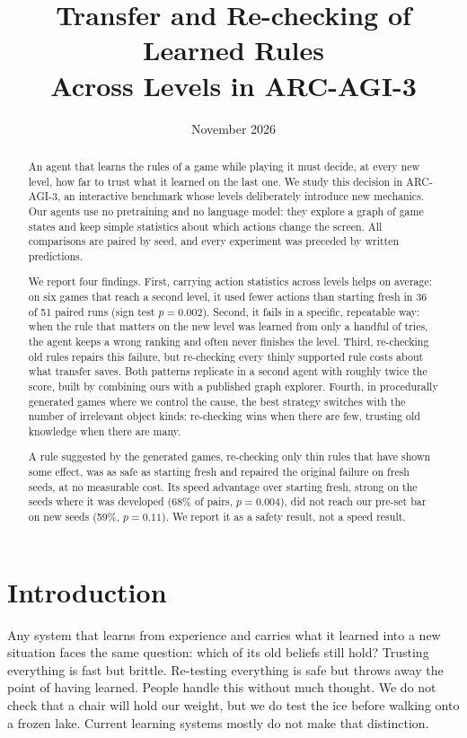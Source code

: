\documentclass[11pt,a4paper]{article}
\title{Transfer and Re-checking of Learned Rules\\Across Levels in ARC-AGI-3}
\author{}
\date{November 2026}
\begin{document}
\maketitle

\begin{abstract}
An agent that learns the rules of a game while playing it must decide, at every new level, how far to trust what it learned on the last one. We study this decision in ARC-AGI-3, an interactive benchmark whose levels deliberately introduce new mechanics. Our agents use no pretraining and no language model: they explore a graph of game states and keep simple statistics about which actions change the screen. All comparisons are paired by seed, and every experiment was preceded by written predictions.

We report four findings. First, carrying action statistics across levels helps on average: on six games that reach a second level, it used fewer actions than starting fresh in 36 of 51 paired runs (sign test $p = 0.002$). Second, it fails in a specific, repeatable way: when the rule that matters on the new level was learned from only a handful of tries, the agent keeps a wrong ranking and often never finishes the level. Third, re-checking old rules repairs this failure, but re-checking every thinly supported rule costs about what transfer saves. Both patterns replicate in a second agent with roughly twice the score, built by combining ours with a published graph explorer. Fourth, in procedurally generated games where we control the cause, the best strategy switches with the number of irrelevant object kinds: re-checking wins when there are few, trusting old knowledge when there are many.

A rule suggested by the generated games, re-checking only thin rules that have shown some effect, was as safe as starting fresh and repaired the original failure on fresh seeds, at no measurable cost. Its speed advantage over starting fresh, strong on the seeds where it was developed (68\% of pairs, $p = 0.004$), did not reach our pre-set bar on new seeds (59\%, $p = 0.11$). We report it as a safety result, not a speed result.
\end{abstract}

\section{Introduction}

Any system that learns from experience and carries what it learned into a new situation faces the same question: which of its old beliefs still hold? Trusting everything is fast but brittle. Re-testing everything is safe but throws away the point of having learned. People handle this without much thought. We do not check that a chair will hold our weight, but we do test the ice before walking onto a frozen lake. Current learning systems mostly do not make that distinction.
\end{document}
